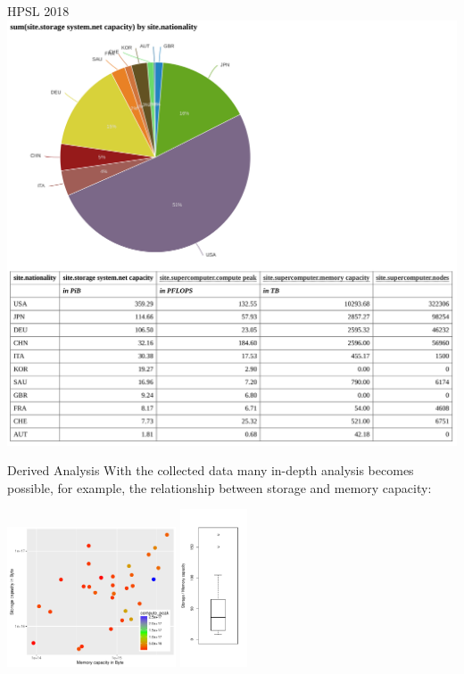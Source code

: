 \documentclass[portrait,a0paper,fontscale=0.4]{baposter}
\begin{document}
\begin{poster}
\begin{posterbox}[name=engineering,column=3]{HPSL 2018}
\includegraphics[width=\textwidth]{hpsl-figure}
\end{posterbox}




\begin{posterbox}[name=awareness,column=3,below=engineering]{Derived Analysis}
With the collected data many in-depth analysis becomes possible, for example,
the relationship between storage and memory capacity:

\vspace*{-1em}

\includegraphics[width=5cm]{memstorage}
\includegraphics[width=2cm]{capacitymemory}


\end{posterbox}
\end{poster}
\end{document}
